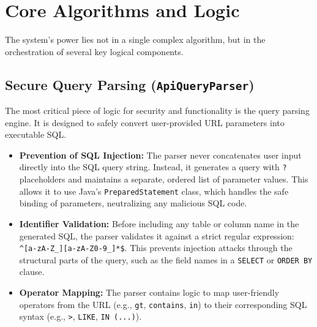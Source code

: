 \documentclass[12pt, a4paper]{report}
\begin{document}
\section{Core Algorithms and Logic}
The system's power lies not in a single complex algorithm, but in the orchestration of several key logical components.

\subsection{Secure Query Parsing (\lstinline|ApiQueryParser|)}
The most critical piece of logic for security and functionality is the query parsing engine. It is designed to safely convert user-provided URL parameters into executable SQL.

\begin{itemize}
    \item \textbf{Prevention of SQL Injection:} The parser never concatenates user input directly into the SQL query string. Instead, it generates a query with \lstinline|?| placeholders and maintains a separate, ordered list of parameter values. This allows it to use Java's \lstinline|PreparedStatement| class, which handles the safe binding of parameters, neutralizing any malicious SQL code.

    \item \textbf{Identifier Validation:} Before including any table or column name in the generated SQL, the parser validates it against a strict regular expression: \lstinline|^[a-zA-Z_][a-zA-Z0-9_]*$|. This prevents injection attacks through the structural parts of the query, such as the field names in a \lstinline|SELECT| or \lstinline|ORDER BY| clause.

    \item \textbf{Operator Mapping:} The parser contains logic to map user-friendly operators from the URL (e.g., \lstinline|gt|, \lstinline|contains|, \lstinline|in|) to their corresponding SQL syntax (e.g., \lstinline|>|, \lstinline|LIKE|, \lstinline|IN (...)|).
\end{itemize}
\end{document}
